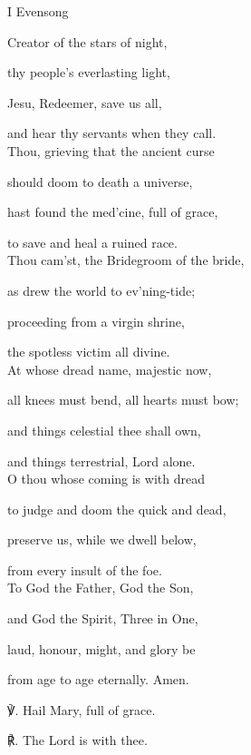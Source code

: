\begin{paracol}{2}[]
\sloppy
\begin{inhead}
	I Evensong
\end{inhead}
\begin{hangparas}{1.25em}{1}

Creator of the stars of night,
 
 thy people's everlasting light,
 
 Jesu, Redeemer, save us all,
 
 and hear thy servants when they call.\\

 Thou, grieving that the ancient curse
 
 should doom to death a universe,
 
 hast found the med'cine, full of grace,
 
 to save and heal a ruined race.\\

 Thou cam'st, the Bridegroom of the bride,
 
 as drew the world to ev'ning-tide;
 
 proceeding from a virgin shrine,
 
 the spotless victim all divine.\\

 At whose dread name, majestic now,
 
 all knees must bend, all hearts must bow;
 
 and things celestial thee shall own,
 
 and things terrestrial, Lord alone.\\

 O thou whose coming is with dread
 
 to judge and doom the quick and dead,
 
 preserve us, while we dwell below,
 
 from every insult of the foe.\\

 To God the Father, God the Son,
 
 and God the Spirit, Three in One,
 
 laud, honour, might, and glory be
 
 from age to age eternally. Amen.\\
\end{hangparas}

℣. Hail Mary, full of grace.

℟. The Lord is with thee.


\end{paracol}
